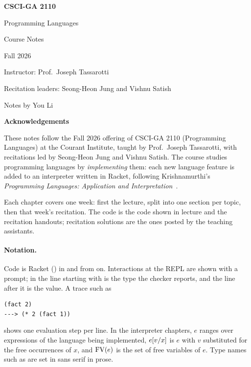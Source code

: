 \documentclass[11pt,oneside]{report}
\begin{document}
\begin{titlepage}
  \raggedright
  \vspace*{2in}
  {\Huge\bfseries CSCI-GA 2110\par}
  \vspace{8pt}
  {\LARGE Programming Languages\par}
  \vspace{8pt}
  {\LARGE Course Notes\par}
  \vspace{8pt}
  {\Large Fall 2026\par}
  \vspace{24pt}
  {\large Instructor: Prof.\ Joseph Tassarotti\par}
  \vspace{4pt}
  {\large Recitation leaders: Seong-Heon Jung and Vishnu Satish\par}
  \vspace{4pt}
  {\large Notes by You Li\par}
\end{titlepage}

\thispagestyle{fancy}
\markright{}
{\Large\bfseries Acknowledgements\par}
\vspace{6pt}
These notes follow the Fall 2026 offering of CSCI-GA 2110 (Programming Languages) at the Courant Institute, taught by Prof.\ Joseph Tassarotti, with recitations led by Seong-Heon Jung and Vishnu Satish. The course studies programming languages by \emph{implementing} them: each new language feature is added to an interpreter written in Racket, following Krishnamurthi's \emph{Programming Languages: Application and Interpretation}~\cite{PLAI}.

Each chapter covers one week: first the lecture, split into one section per topic, then that week's recitation. The code is the code shown in lecture and the recitation handouts; recitation solutions are the ones posted by the teaching assistants.

\paragraph{Notation.} Code is Racket () in  and  from  on. Interactions at the REPL are shown with a \code{>} prompt; in  the line starting with \code{-} is the type the checker reports, and the line after it is the value. A trace such as
\begin{lstlisting}[style=repl]
(fact 2)
---> (* 2 (fact 1))
\end{lstlisting}
shows one evaluation step per line. In the interpreter chapters, $e$ ranges over expressions of the language being implemented, $e[v/x]$ is $e$ with $v$ substituted for the free occurrences of $x$, and $\mathrm{FV}(e)$ is the set of free variables of $e$. Type names such as  are set in sans serif in prose.
\end{document}
